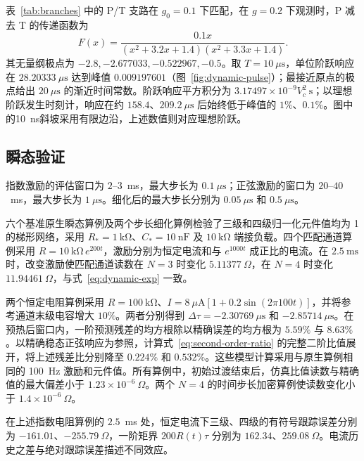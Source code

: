 表~\ref{tab:branches} 中的 P/T 支路在 $g_0=0.1$ 下匹配，在 $g=0.2$ 下观测时，P 减去 T 的传递函数为
\begin{equation}\label{eq:dynamic-pt}
F(x)=\frac{0.1x}{(x^2+3.2x+1.4)(x^2+3.3x+1.4)}.
\end{equation}
其无量纲极点为 $-2.8,-2.677033,-0.522967,-0.5$。取 $T=10~\mu\mathrm s$，单位阶跃响应在 $28.20333~\mu\mathrm s$ 达到峰值 $0.009197601$（图~\ref{fig:dynamic-pulse}）；最接近原点的极点给出 $20~\mu\mathrm s$ 的渐近时间常数。阶跃响应平方积分为 $3.17497\times10^{-9}V_c^2~\mathrm s$；以理想阶跃发生时刻计，响应在约 $158.4$、$209.2~\mu\mathrm s$ 后始终低于峰值的 $1\%$、$0.1\%$。图中的10~ns斜坡采用有限边沿，上述数值则对应理想阶跃。




\subsection{瞬态验证}
\label{sec:dynamic-verif}

指数激励的评估窗口为 $2$--$3$~ms，最大步长为 $0.1~\mu\mathrm s$；正弦激励的窗口为 $20$--$40$~ms，最大步长为 $1~\mu\mathrm s$。细化后的最大步长分别为 $0.05~\mu\mathrm s$ 和 $0.5~\mu\mathrm s$。

六个基准原生瞬态算例及两个步长细化算例检验了三级和四级归一化元件值均为 1 的梯形网络，采用 $R_*=1~\mathrm{k\Omega}$、$C_*=10~\mathrm{nF}$ 及 $10~\mathrm{k\Omega}$ 端接负载。四个匹配通道算例采用 $R=10~\mathrm{k\Omega}\,e^{200t}$，激励分别为恒定电流和与 $e^{1000t}$ 成正比的电流。在 $2.5~\mathrm{ms}$ 时，改变激励使匹配通道读数在 $N=3$ 时变化 $5.11377~\Omega$，在 $N=4$ 时变化 $11.94461~\Omega$，与式~\eqref{eq:dynamic-exp} 一致。

两个恒定电阻算例采用 $R=100~\mathrm{k\Omega}$、$I=8~\mu\mathrm A[1+0.2\sin(2\pi100t)]$，并将参考通道末级电容增大 $10\%$。两者分别得到 $\Delta\tau=-2.30769~\mu\mathrm s$ 和 $-2.85714~\mu\mathrm s$。在预热后窗口内，一阶预测残差的均方根除以精确误差的均方根为 $5.59\%$ 与 $8.63\%$。以精确稳态正弦响应为参照，计算式~\eqref{eq:second-order-ratio} 的完整二阶比值展开，将上述残差比分别降至 $0.224\%$ 和 $0.532\%$。这些模型计算采用与原生算例相同的 100~Hz 激励和元件值。所有算例中，初始过渡结束后，仿真比值读数与精确值的最大偏差小于 $1.23\times10^{-6}~\Omega$。两个 $N=4$ 的时间步长加密算例使读数变化小于 $1.4\times10^{-6}~\Omega$。

在上述指数电阻算例的 $2.5$~ms 处，恒定电流下三级、四级的有符号跟踪误差分别为 $-161.01$、$-255.79~\Omega$，一阶矩界 $200R(t)\tau$ 分别为 $162.34$、$259.08~\Omega$。电流历史之差与绝对跟踪误差描述不同效应。

